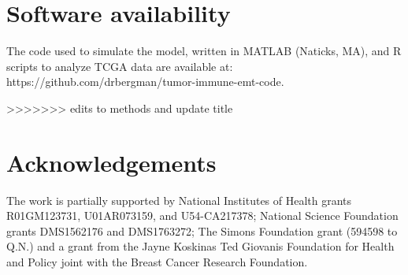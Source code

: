 \documentclass[11pt]{article}
\begin{document}
\section*{Software availability}
The code used to simulate the model, written in MATLAB (Naticks, MA), and R scripts to analyze TCGA data are available at: https://github.com/drbergman/tumor-immune-emt-code.

>>>>>>> edits to methods and update title
\section*{Acknowledgements}
The work is partially supported by National Institutes of Health grants R01GM123731, U01AR073159, and U54-CA217378; National Science Foundation grants DMS1562176 and DMS1763272; The Simons Foundation grant (594598 to Q.N.) and a grant from the Jayne Koskinas Ted Giovanis Foundation for Health and Policy joint with the Breast Cancer Research Foundation.




\end{document}
